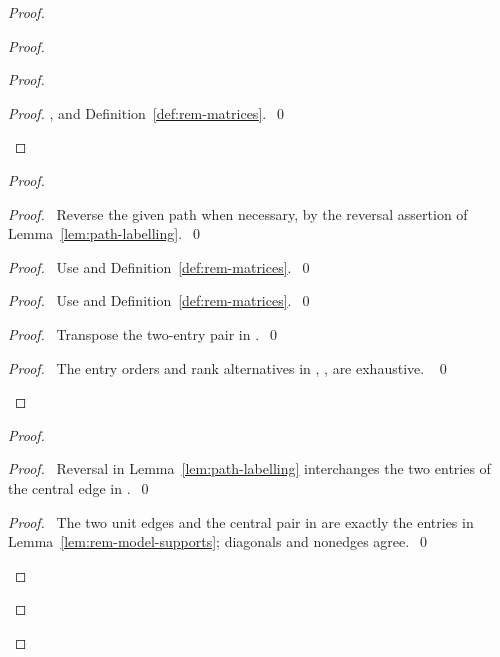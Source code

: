 \begin{proof}
\begin{proof}
\begin{proof}
\begin{proof}
, and Definition~\ref{def:rem-matrices}.~\qed\end{proof}
\end{proof}
\begin{proof}
\begin{proof}\pf\ Reverse the given path when necessary, by the
reversal assertion of Lemma~\ref{lem:path-labelling}.~\qed\end{proof}
\begin{proof}\pf\ Use  and Definition~\ref{def:rem-matrices}.~\qed\end{proof}
\begin{proof}\pf\ Use  and Definition~\ref{def:rem-matrices}.~\qed\end{proof}
\begin{proof}\pf\ Transpose the two-entry pair in .~\qed\end{proof}
\qedstep
\begin{proof}\pf\ The entry orders and rank alternatives in
, ,  are exhaustive. ~\qed\end{proof}
\end{proof}
\begin{proof}
\begin{proof}\pf\ Reversal in Lemma~\ref{lem:path-labelling}
interchanges the two entries of the central edge in .~\qed\end{proof}
\qedstep
\begin{proof}\pf\ The two unit edges and the central pair in
 are exactly the entries in
Lemma~\ref{lem:rem-model-supports}; diagonals and nonedges agree.~\qed\end{proof}
\end{proof}

\end{proof}
\end{proof}
